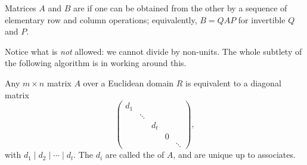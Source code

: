 \documentclass[a4paper]{scrartcl}
\begin{document}
\begin{definition}[Equivalence]
	Matrices $A$ and $B$ are  if one can be obtained from the other by a sequence of elementary row and column operations; equivalently, $B = QAP$ for invertible $Q$ and $P$.
\end{definition}

Notice what is \emph{not} allowed: we cannot divide by non-units. The whole subtlety of the following algorithm is in working around this.

\begin{theorem}
	Any $m \times n$ matrix $A$ over a Euclidean domain $R$ is equivalent to a diagonal matrix
	$$
	\begin{pmatrix}
		d_1 & & & \\
		& \ddots & & \\
		& & d_t & \\
		& & & 0 \\
		& & & & \ddots
	\end{pmatrix},
	$$
	with $d_1 \mid d_2 \mid \cdots \mid d_t$. The $d_i$ are called the  of $A$, and are unique up to associates.
\end{theorem}
\end{document}
